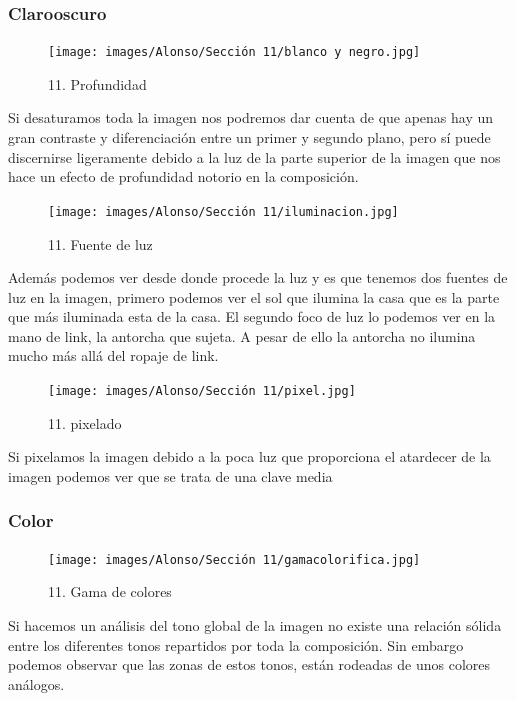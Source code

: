 \documentclass[12pt]{article}
\begin{document}
        \subsubsection{Clarooscuro}
        \begin{figure}[H]
      \centering
      \texttt{[image: images/Alonso/Sección 11/blanco y negro.jpg]}
      \caption{\small 11. Profundidad}
    \end{figure}
    Si desaturamos toda la imagen nos podremos dar cuenta de que apenas hay un gran contraste y diferenciación entre un primer y segundo plano, pero sí puede discernirse ligeramente debido a la luz de la parte superior de la imagen que nos hace un efecto de profundidad notorio en la composición.

    \begin{figure}[H]
      \centering
      \texttt{[image: images/Alonso/Sección 11/iluminacion.jpg]}
      \caption{\small 11. Fuente de luz}
    \end{figure}

    Además podemos ver desde donde procede la luz y es que tenemos dos fuentes de luz en la imagen, primero podemos ver el sol que ilumina la casa que es la parte que más iluminada esta de la casa. El segundo foco de luz lo podemos ver en la mano de link, la antorcha que sujeta. A pesar de ello la antorcha no ilumina mucho más allá del ropaje de link.

\begin{figure}[H]
      \centering
      \texttt{[image: images/Alonso/Sección 11/pixel.jpg]}
      \caption{\small 11. pixelado}
    \end{figure}

    Si pixelamos la imagen debido a la poca luz que proporciona el atardecer de la imagen podemos ver que se trata de una clave media

        \subsubsection{Color}
\begin{figure}[H]
      \centering
      \texttt{[image: images/Alonso/Sección 11/gamacolorifica.jpg]}
      \caption{\small 11. Gama de colores}
    \end{figure}

        Si hacemos un análisis del tono global de la imagen no existe una relación sólida entre los diferentes tonos repartidos por toda la composición. Sin embargo podemos observar que las zonas de estos tonos, están rodeadas de unos colores análogos.
\end{document}
